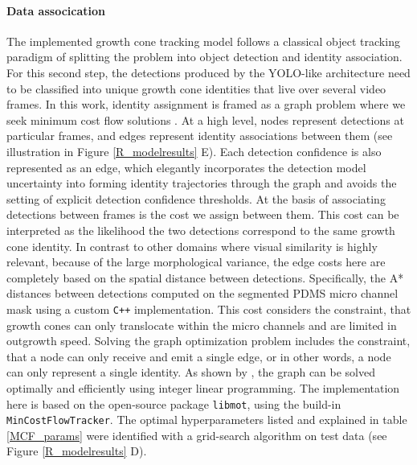 \paragraph{Data assocication}
\label{data_association}
The implemented growth cone tracking model follows a classical object tracking
paradigm of splitting the problem into object detection and identity
association. For this second step, the detections produced by the YOLO-like
architecture need to be classified into unique growth cone identities that live
over several video frames. In this work, identity assignment is framed as a
graph problem where we seek minimum cost flow solutions \parencite{MCF}. At a
high level, nodes represent detections at particular frames, and edges represent
identity associations between them (see illustration in Figure
\ref{R_modelresults} E). Each detection confidence is also represented as an
edge, which elegantly incorporates the detection model uncertainty into forming
identity trajectories through the graph and avoids the setting of explicit
detection confidence thresholds. At the basis of associating detections between
frames is the cost we assign between them. This cost can be interpreted as the
likelihood the two detections correspond to the same growth cone identity. In
contrast to other domains where visual similarity is highly relevant, because of
the large morphological variance, the edge costs here are completely based on
the spatial distance between detections. Specifically, the A* distances
\parencite{astar} between detections computed on the segmented PDMS micro
channel mask using a custom \verb|C++| implementation. This cost considers the
constraint, that growth cones can only translocate within the micro channels and
are limited in outgrowth speed. Solving the graph optimization problem includes
the constraint, that a node can only receive and emit a single edge, or in other
words, a node can only represent a single identity. As shown by \cite{MCF}, the
graph can be solved optimally and efficiently using integer linear programming.
The implementation here is based on the open-source package \verb|libmot|, using
the build-in \verb|MinCostFlowTracker|. The optimal hyperparameters listed and
explained in table \ref{MCF_params} were identified with a grid-search algorithm
on test data (see Figure \ref{R_modelresults} D). 

